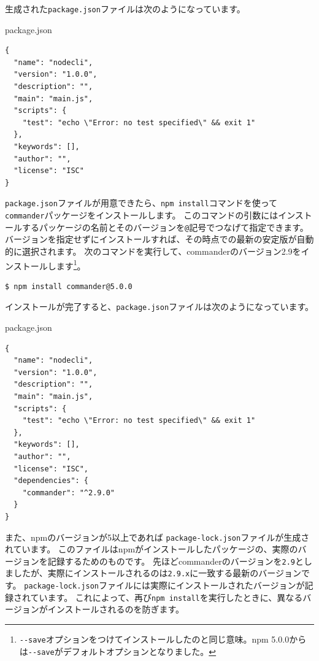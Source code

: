生成された\texttt{package.json}ファイルは次のようになっています。

\begin{listtitle}
package.json
\end{listtitle}
\begin{lstlisting}
{
  "name": "nodecli",
  "version": "1.0.0",
  "description": "",
  "main": "main.js",
  "scripts": {
    "test": "echo \"Error: no test specified\" && exit 1"
  },
  "keywords": [],
  "author": "",
  "license": "ISC"
}
\end{lstlisting}
\listend

\texttt{package.json}ファイルが用意できたら、\texttt{npm install}コマンドを使って\texttt{commander}パッケージをインストールします。
このコマンドの引数にはインストールするパッケージの名前とそのバージョンを\texttt{@}記号でつなげて指定できます。
バージョンを指定せずにインストールすれば、その時点での最新の安定版が自動的に選択されます。
次のコマンドを実行して、commanderのバージョン2.9をインストールします\footnote{\texttt{-\/-save}オプションをつけてインストールしたのと同じ意味。npm
  5.0.0からは\texttt{-\/-save}がデフォルトオプションとなりました。}。

\begin{lstlisting}
$ npm install commander@5.0.0
\end{lstlisting}

インストールが完了すると、\texttt{package.json}ファイルは次のようになっています。

\begin{listtitle}
package.json
\end{listtitle}
\begin{lstlisting}
{
  "name": "nodecli",
  "version": "1.0.0",
  "description": "",
  "main": "main.js",
  "scripts": {
    "test": "echo \"Error: no test specified\" && exit 1"
  },
  "keywords": [],
  "author": "",
  "license": "ISC",
  "dependencies": {
    "commander": "^2.9.0"
  }
}
\end{lstlisting}
\listend

また、npmのバージョンが5以上であれば
\texttt{package-lock.json}ファイルが生成されています。
このファイルはnpmがインストールしたパッケージの、実際のバージョンを記録するためのものです。
先ほどcommanderのバージョンを\texttt{2.9}としましたが、実際にインストールされるのは\texttt{2.9.x}に一致する最新のバージョンです。
\texttt{package-lock.json}ファイルには実際にインストールされたバージョンが記録されています。
これによって、再び\texttt{npm install}を実行したときに、異なるバージョンがインストールされるのを防ぎます。

